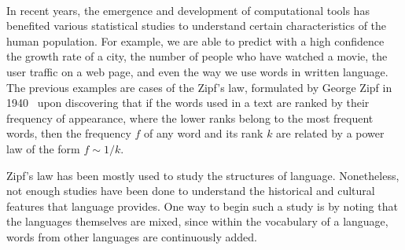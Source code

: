\documentclass[10pt,letterpaper]{article} %
\begin{document}
\

In recent years, the emergence and development of computational tools has
benefited various statistical studies to understand certain characteristics of
the human population. For example, we are able to predict with a high confidence the growth rate of a
city, the number of people who have watched a movie, the user traffic on a web
page, and even the way we use words in written language. The previous examples
are cases of the Zipf's law, formulated by George Zipf in 1940~\cite{Zipf} upon
discovering that if  the words used in a text are ranked by their frequency of
appearance, where the lower ranks belong to the most frequent words,  then the
frequency  $f$  of any word and its rank  $k$ are related by a power law of the
form $f\sim1/k$.





Zipf's law has been mostly used to study the structures of language.
Nonetheless, not enough studies have been done to understand the historical and
cultural features that language provides. One way to begin such a study is by
noting that the languages themselves are mixed, since within the vocabulary of
a language, words from other languages are continuously added.
\end{document}
